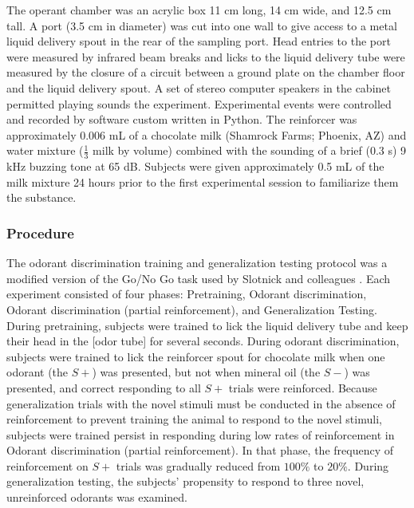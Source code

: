 The operant chamber was an acrylic box 11 cm long, 14 cm wide, and 12.5 cm tall. A port (3.5 cm in diameter) was cut into one wall to give access to a metal liquid delivery spout in the rear of the sampling port. Head entries to the port were measured by infrared beam breaks and licks to the liquid delivery tube were measured by the closure of a circuit between a ground plate on the chamber floor and the liquid delivery spout. A set of stereo computer speakers in the cabinet permitted playing sounds the experiment.  Experimental events were controlled and recorded by software custom written in Python.
The reinforcer was approximately 0.006 mL of a chocolate milk (Shamrock Farms; Phoenix, AZ) and water mixture ($\frac{1}{3}$ milk by volume) combined with the sounding of a brief (0.3 s) 9 kHz buzzing tone at 65 dB. Subjects were given approximately 0.5 mL of the milk mixture 24 hours prior to the first experimental session to familiarize them the substance.  

\subsubsection{Procedure}
\label{sec:methods_procedure}
The odorant discrimination training and generalization testing protocol was a modified version of the Go/No Go task used by Slotnick and colleagues \cite{18428626}. Each experiment consisted of four phases: Pretraining, Odorant discrimination, Odorant discrimination (partial reinforcement), and Generalization Testing. During pretraining, subjects were trained to lick the liquid delivery tube and keep their head in the [odor tube] for several seconds. During odorant discrimination, subjects were trained to lick the reinforcer spout for chocolate milk when one odorant (the $S+$) was presented, but not when mineral oil (the $S-$) was presented, and correct responding to all $S+$ trials were reinforced. Because generalization trials with the novel stimuli must be conducted in the absence of reinforcement to prevent training the animal to respond to the novel stimuli, subjects were trained persist in responding during low rates of reinforcement in Odorant discrimination (partial reinforcement). In that phase, the frequency of reinforcement on $S+$ trials was gradually reduced from $100\%$ to $20\%$. During generalization testing, the subjects' propensity to respond to three novel, unreinforced odorants was examined.

